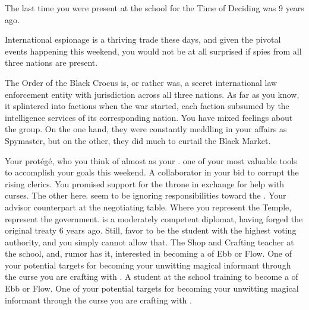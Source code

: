 \documentclass[char]{GL2020}
\begin{document}
\begin{itemz}[Notes]
	\item The last time you were present at the school for the Time of Deciding was 9 years ago.
	\item International espionage is a thriving trade these days, and given the pivotal events happening this weekend, you would not be at all surprised if spies from all three nations are present. 
	\item The Order of the Black Crocus is, or rather was, a secret international law enforcement entity with jurisdiction across all three nations. As far as you know, it splintered into factions when the war started, each faction subsumed by the intelligence services of its corresponding nation. You have mixed feelings about the group. On the one hand, they were constantly meddling in your affairs as Spymaster, but on the other, they did much to curtail the Black Market.
\end{itemz}

\begin{contacts}
	\contact{\cScholarship{}} Your protégé, who you think of almost as your \cScholarship{\child}. \cScholarship{\They} \cScholarship{\are} one of your most valuable tools to accomplish your goals this weekend.
            \contact{\cPrince{}} A collaborator in your bid to corrupt the rising \pShip{} clerics. You promised support for the throne in exchange for \cPrince{\their} help with curses.
	\contact{\cBeetle{}} The other \pTech{} \cBeetle{\cleric} here. \cBeetle{\They} seem\cBeetle{\plural} to be ignoring \cBeetle{\their} responsibilities toward the \pTech{}.
	\contact{\cDiplomat{}} Your advisor counterpart at the negotiating table. Where you represent the Temple, \cDiplomat{\they} represent\cDiplomat{\plural} the government. \cDiplomat{} is a moderately competent diplomat, having forged the original treaty 6 years ago. Still, \cDiplomat{\they} favor \cHeir{} to be the student with the highest voting authority, and you simply cannot allow that.
	\contact{\cPirate{}} The Shop and Crafting teacher at the school, and, rumor has it, interested in becoming a \cPirate{\cleric} of Ebb or Flow. One of your potential targets for becoming your unwitting magical informant through the curse you are crafting with \cPrince{}.
	\contact{\cInitiate{}} A student at the school training to become a \cInitiate{\cleric} of Ebb or Flow. One of your potential targets for becoming your unwitting magical informant through the curse you are crafting with \cPrince{}.
\end{contacts}
\end{document}
